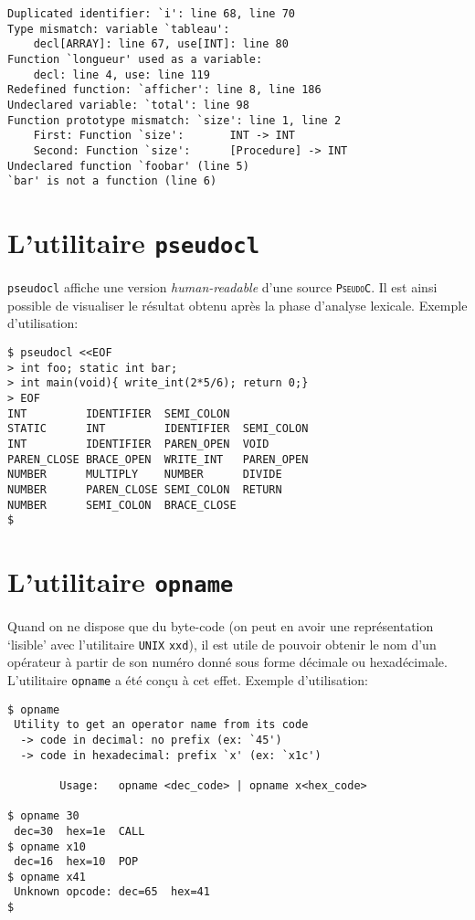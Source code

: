 \documentclass[12pt,a4paper,openright]{report}
\newcommand{\nom}[1]{\textsc{\texttt{#1}}}
\newcommand{\pc}{\nom{PseudoC}}
\begin{document}
\begin{verbatim}
Duplicated identifier: `i': line 68, line 70
Type mismatch: variable `tableau':
    decl[ARRAY]: line 67, use[INT]: line 80
Function `longueur' used as a variable:
    decl: line 4, use: line 119
Redefined function: `afficher': line 8, line 186
Undeclared variable: `total': line 98
Function prototype mismatch: `size': line 1, line 2
    First: Function `size':       INT -> INT
    Second: Function `size':      [Procedure] -> INT
Undeclared function `foobar' (line 5)
`bar' is not a function (line 6)
\end{verbatim}

    \section{L'utilitaire \texttt{pseudocl}}
        \texttt{pseudocl} affiche une version \textit{human-readable}
        d'une source \pc. Il est ainsi possible de visualiser le
        résultat obtenu après la phase d'analyse lexicale. Exemple
        d'utilisation:

\begin{verbatim}
$ pseudocl <<EOF
> int foo; static int bar;
> int main(void){ write_int(2*5/6); return 0;}
> EOF
INT         IDENTIFIER  SEMI_COLON
STATIC      INT         IDENTIFIER  SEMI_COLON
INT         IDENTIFIER  PAREN_OPEN  VOID
PAREN_CLOSE BRACE_OPEN  WRITE_INT   PAREN_OPEN
NUMBER      MULTIPLY    NUMBER      DIVIDE
NUMBER      PAREN_CLOSE SEMI_COLON  RETURN
NUMBER      SEMI_COLON  BRACE_CLOSE
$ 
\end{verbatim}

    \section{L'utilitaire \texttt{opname}}
        Quand on ne dispose que du byte-code (on peut en avoir une
        représentation `lisible' avec l'utilitaire \nom{UNIX}{} \texttt{xxd}),
        il est utile de pouvoir obtenir le nom d'un opérateur à partir de
        son numéro donné sous forme décimale ou hexadécimale. L'utilitaire
        \texttt{opname} a été conçu à cet effet. Exemple d'utilisation:

\begin{verbatim}
$ opname
 Utility to get an operator name from its code
  -> code in decimal: no prefix (ex: `45')
  -> code in hexadecimal: prefix `x' (ex: `x1c')

        Usage:   opname <dec_code> | opname x<hex_code>

$ opname 30
 dec=30  hex=1e  CALL
$ opname x10
 dec=16  hex=10  POP
$ opname x41
 Unknown opcode: dec=65  hex=41
$
\end{verbatim}
\end{document}
